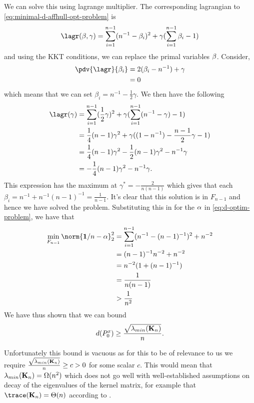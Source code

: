 We can solve this using lagrange multiplier. The corresponding lagrangian to
\ref{eq:minimal-d-affhull-opt-problem} is
\begin{equation*}
  \lagr(\mat{\beta}, \gamma) = \sum_{i=1}^{n-1} (n^{-1} - \beta_{i})^{2} + \gamma (\sum_{i=1}^{n-1} \beta_i - 1)
\end{equation*}
and using the KKT conditions, we can replace the primal variables
\(\mathbf{\beta}\). Consider,
\begin{align*}
  \pdv{\lagr}{\beta_{i}} & = 2(\beta_{i} - n^{-1}) + \gamma \\
                         & = 0
\end{align*}
which means that we can set \(\beta_{i} = n^{-1} - \frac{1}{2}\gamma\). We then
have the following
\begin{align*}
  \lagr(\gamma) & = \sum_{i=1}^{n-1} (\frac{1}{2} \gamma)^{2} + \gamma (\sum_{i=1}^{n-1} (n^{-1} - \gamma) - 1) \\
                & = \frac{1}{4}(n-1)\gamma^{2} + \gamma((1 - n^{-1}) - \frac{n-1}{2}\gamma - 1) \\
                & = \frac{1}{4}(n-1)\gamma^{2} - \frac{1}{2}(n-1)\gamma^{2} - n^{-1} \gamma \\
                & = -\frac{1}{4}(n-1)\gamma^{2} - n^{-1} \gamma.
\end{align*}
This expression has the maximum at \(\gamma^{\ast} = -\frac{2}{n(n-1)}\) which
gives that each \(\beta_{i} = n^{-1} + n^{-1}(n-1)^{-1} = \frac{1}{n-1}\). It's
clear that this solution is in \(F_{n-1}\) and hence we have solved the problem.
Substituting this in for the \(\mathbf{\alpha}\) in
\ref{eq:d-optim-problem}, we have that
\begin{align*}
  \min_{F_{n-1}}\norm{\mathbf{1}/n - \mat{\alpha}}_{2}^2 & = \sum_{i=1}^{n-1}(n^{-1} - (n-1)^{-1})^{2} + n^{-2} \\
                                                         & = (n-1)^{-1}n^{-2} + n^{-2} \\
                                                         & = n^{-2}(1 + (n-1)^{-1}) \\
                                                         & = \frac{1}{n(n-1)} \\
                                                         & > \frac{1}{n^{2}}
\end{align*}
We have thus shown that we can bound
\begin{equation}
  \label{eq:lower-bound-on-d}
  d(P^x_{0}) \geq \frac{\sqrt{\lambda_{min}(\mathbf{K}_{n})}}{n}.
\end{equation}

Unfortunately this bound is vacuous as for this to be of relevance to us we
require \(\frac{\sqrt{\lambda_{min}(\mathbf{K}_{n})}}{n} \geq c > 0\) for some
scalar \(c\). This would mean that \(\lambda_{min}(\mathbf{K}_{n}) =
\Omega(n^{2})\) which does not go well with well-established assumptions on
decay of the eigenvalues of the kernel matrix, for example that
\(\trace(\mat{K}_{n}) = \Theta(n)\) according to \cite{bach13_sharp}.
